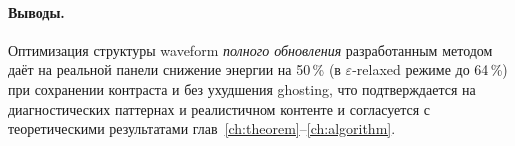\paragraph{Выводы.} Оптимизация структуры waveform \emph{полного обновления}
разработанным методом даёт на реальной панели снижение энергии на
50\,\% (в $\varepsilon$-relaxed режиме до 64\,\%) при сохранении контраста и без ухудшения ghosting, что подтверждается
на диагностических паттернах и реалистичном контенте и согласуется с
теоретическими результатами глав~\ref{ch:theorem}--\ref{ch:algorithm}.

